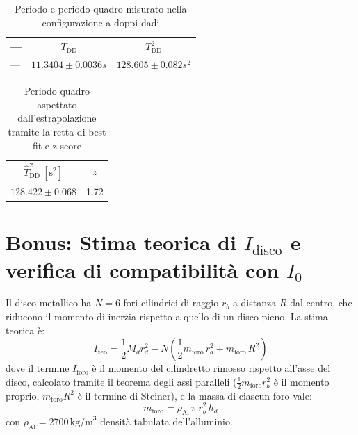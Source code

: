 \documentclass{article}
\begin{document}
{\def\arraystretch{1.7}\tabcolsep=12pt
	\begin{table}[h!]
		\begin{center}
			\begin{tabular}{|l|c|c|}
				\hline
				 --- & $ T_\mathrm{DD} $ & $ T_\mathrm{DD}^2 $  \\
				\hline
				--- & $11.3404 \pm 0.0036 s$& $128.605 \pm 0.082 s^2$  \\ 
				\hline				
			\end{tabular}
		\end{center}
		\caption{Periodo e periodo quadro misurato nella configurazione a doppi dadi}
		\label{tab8}
	\end{table}
}

{\def\arraystretch{1.7}\tabcolsep=12pt
	\begin{table}[h!]
		\begin{center}
			\begin{tabular}{|c|c|}
				\hline
				 $ \hat{T}^2_\mathrm{DD}\ [\mathrm{s}^2] $ & $ z $ \\
				\hline
				$128.422 \pm 0.068$ & 1.72  \\
				\hline
			\end{tabular}
		\end{center}
		\caption{Periodo quadro aspettato dall'estrapolazione tramite la retta di best fit e z-score}
		\label{tab9}
	\end{table}
}


\newpage

\section{Bonus: Stima teorica di $I_\text{disco}$ e verifica di compatibilità con $I_0$}
 
Il disco metallico ha $N=6$ fori cilindrici di raggio $r_b$ a distanza $R$ dal centro, che riducono il momento di inerzia rispetto a quello di un disco pieno. La stima teorica è:
\begin{equation}
    I_\text{teo} = \frac{1}{2}M_d r_d^2
    - N \left(\frac{1}{2}m_\text{foro}\,r_b^2 + m_\text{foro}\,R^2\right)
    \label{eq:Iteo}
\end{equation}
dove il termine $I_\text{foro}$ è il momento del cilindretto rimosso rispetto all'asse del disco, calcolato tramite il teorema degli assi paralleli ($\frac{1}{2}m_\text{foro}r_b^2$ è il momento proprio, $m_\text{foro}R^2$ è il termine di Steiner), e la massa di ciascun foro vale:
\begin{equation}
    m_\text{foro} = \rho_\text{Al}\,\pi\,r_b^2\,h_d
\end{equation}
con $\rho_\text{Al} = 2700\,\text{kg/m}^3$ densità tabulata dell'alluminio.
 
\end{document}
